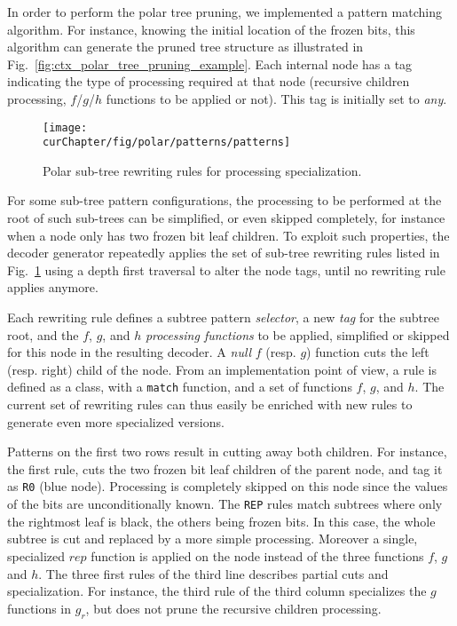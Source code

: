 In order to perform the polar tree pruning, we implemented a pattern matching
algorithm. For instance, knowing the initial location of the frozen bits, this
algorithm can generate the pruned tree structure as illustrated in
Fig.~\ref{fig:ctx_polar_tree_pruning_example}. Each internal node has a tag
indicating the type of processing required at that node (recursive children
processing, $f$/$g$/$h$ functions to be applied or not). This tag is initially
set to \emph{any}.

\begin{figure}[htp]
  \centering
  \texttt{[image: \\curChapter/fig/polar/patterns/patterns]}
  \caption{Polar sub-tree rewriting rules for processing specialization.}
  \label{fig:opt_polar_patterns}
\end{figure}

For some sub-tree pattern configurations, the processing to be performed at the
root of such sub-trees can be simplified, or even skipped completely, for
instance when a node only has two frozen bit leaf children. To exploit such
properties, the decoder generator repeatedly applies the set of sub-tree
rewriting rules listed in Fig.~\ref{fig:opt_polar_patterns} using a depth first
traversal to alter the node tags, until no rewriting rule applies anymore.

Each rewriting rule defines a subtree pattern \emph{selector}, a new \emph{tag}
for the subtree root, and the $f$, $g$, and $h$ \emph{processing functions} to
be applied, simplified or skipped for this node in the resulting decoder. A
\emph{null} $f$ (resp. $g$) function cuts the left (resp. right) child of the
node. From an implementation point of view, a rule is defined as a class, with a
\verb|match| function, and a set of functions $f$, $g$, and $h$. The current
set of rewriting rules can thus easily be enriched with new rules to generate
even more specialized versions.

Patterns on the first two rows result in cutting away both children. For
instance, the first rule, cuts the two frozen bit leaf children of the parent
node, and tag it as \verb|R0| (blue node). Processing is completely skipped on
this node since the values of the bits are unconditionally known. The \verb|REP|
rules match subtrees where only the rightmost leaf is black, the others being
frozen bits. In this case, the whole subtree is cut and replaced by a more
simple processing. Moreover a single, specialized $rep$ function is applied
on the node instead of the three functions $f$, $g$ and $h$. The three first
rules of the third line describes partial cuts and specialization. For instance,
the third rule of the third column specializes the $g$ functions in $g_r$, but
does not prune the recursive children processing.

